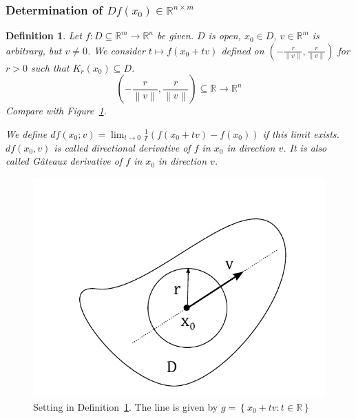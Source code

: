 \documentclass{article}
\newtheorem{definition}{Definition}  \numberwithin{definition}{section}
\newcommand{\set}[1]{\left\{#1\right\}}
\newcommand{\norm}[1]{\left\|#1\right\|}
\begin{document}
\subsubsection{Determination of $Df(x_0) \in \mathbb R^{n \times m}$}

\begin{definition}
  \label{defin5}
  Let $f: D \subseteq \mathbb R^m \to \mathbb R^n$ be given.
  $D$ is open, $x_0 \in D$, $v \in \mathbb R^m$ is arbitrary, but $v \neq 0$.
  We consider $t \mapsto f(x_0 + tv)$ defined on $(-\frac{r}{\norm{v}}, \frac{r}{\norm{v}})$
  for $r > 0$ such that $K_r(x_0) \subseteq D$.
  \[ \left(-\frac{r}{\norm{v}}, \frac{r}{\norm{v}}\right) \subseteq \mathbb R \to \mathbb R^n \]
  Compare with Figure~\ref{img:set5}.

  We define $df(x_0; v) = \lim_{t \to 0} \frac1{t} (f(x_0 + tv) - f(x_0))$ if this limit exists. $df(x_0, v)$ is called \emph{directional derivative} of $f$ in $x_0$ in direction $v$. It is also called \emph{G\^ateaux derivative of $f$ in $x_0$ in direction $v$}.
\end{definition}

\begin{figure}[t]
  \begin{center}
    \includegraphics{img/31_setting.pdf}
    \caption{Setting in Definition~\ref{defin5}. The line is given by $g = \set{x_0 + tv: t \in \mathbb R}$}
    \label{img:set5}
  \end{center}
\end{figure}
\end{document}

